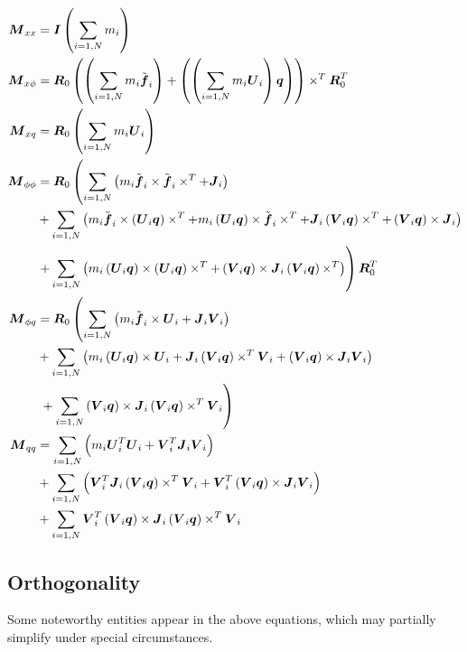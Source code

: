\begin{align}
	\T{M}_{xx}	&= \T{I} \plbr{\sum_{i=1,N} m_i} \\
	\T{M}_{x\phi}	&= \T{R}_0 \plbr{\plbr{
		\sum_{i=1,N} m_i \tilde{\T{f}}_i
	} + \plbr{\plbr{
		\sum_{i=1,N} m_i \T{U}_i
	} \T{q}}} \times^T \T{R}_0^T \\
	\T{M}_{xq}	&= \T{R}_0 \plbr{\sum_{i=1,N} m_i \T{U}_i} \\
	\T{M}_{\phi\phi}&= \T{R}_0 \lplbr{
		\sum_{i=1,N} \plbr{
			m_i \tilde{\T{f}}_i \times \tilde{\T{f}}_i\times^T
			+ \T{J}_i
		}
	} \nonumber \\
			& \mbox{} + \sum_{i=1,N} \plbr{
			m_i \tilde{\T{f}}_i \times \plbr{\T{U}_i \T{q}}\times^T
			+ m_i \plbr{\T{U}_i \T{q}}\times \tilde{\T{f}}_i \times^T
			+ \T{J}_i \plbr{\T{V}_i \T{q}}\times^T
			+ \plbr{\T{V}_i \T{q}}\times \T{J}_i
	} \nonumber \\
			& \rplbr{ \mbox + \sum_{i=1,N} \plbr{
			m_i \plbr{\T{U}_i \T{q}}\times \plbr{\T{U}_i \T{q}}\times^T
			+ \plbr{\T{V}_i \T{q}}\times \T{J}_i \plbr{\T{V}_i \T{q}}\times^T
	}} \T{R}_0^T \\
	\T{M}_{\phi q}	&= \T{R}_0 \lplbr{
		\sum_{i=1,N} \plbr{
			m_i \tilde{\T{f}}_i \times \T{U}_i
			+ \T{J}_i \T{V}_i
		}
	} \nonumber \\
			& \mbox{} + \sum_{i=1,N} \plbr{
			m_i \plbr{\T{U}_i \T{q}} \times \T{U}_i
			+ \T{J}_i \plbr{\T{V}_i \T{q}}\times^T \T{V}_i
			+ \plbr{\T{V}_i \T{q}}\times \T{J}_i \T{V}_i
	} \nonumber \\
			& \rplbr{ \mbox{} + \sum_{i=1,N} \plbr{\T{V}_i \T{q}}\times \T{J}_i \plbr{\T{V}_i \T{q}}\times^T \T{V}_i
	} \\
	\T{M}_{qq}	&= \sum_{i=1,N} \plbr{
		m_i \T{U}_i^T \T{U}_i
		+ \T{V}_i^T \T{J}_i \T{V}_i
	} \nonumber \\
			& \mbox{} + \sum_{i=1,N} \plbr{
			\T{V}_i^T \T{J}_i \plbr{\T{V}_i \T{q}}\times^T \T{V}_i
			+ \T{V}_i^T \plbr{\T{V}_i \T{q}}\times \T{J}_i \T{V}_i
	} \nonumber \\
			& \mbox{} + \sum_{i=1,N}
			\T{V}_i^T \plbr{\T{V}_i \T{q}}\times \T{J}_i \plbr{\T{V}_i \T{q}}\times^T \T{V}_i
\end{align}

\subsection{Orthogonality}
Some noteworthy entities appear in the above equations, which may partially
simplify under special circumstances.

